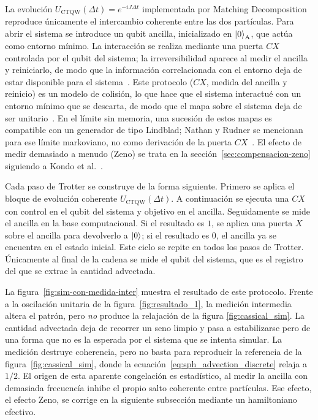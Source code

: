 La evolución $U_{\mathrm{CTQW}}(\Delta t)=e^{-iJ\Delta t}$ implementada por Matching Decomposition reproduce únicamente el intercambio coherente entre las dos partículas. Para abrir el sistema se introduce un qubit ancilla, inicializado en $\ket{0}_{\mathrm{A}}$, que actúa como entorno mínimo. La interacción se realiza mediante una puerta $CX$ controlada por el qubit del sistema; la irreversibilidad aparece al medir el ancilla y reiniciarlo, de modo que la información correlacionada con el entorno deja de estar disponible para el sistema~\cite{nielsen2010}. Este protocolo ($CX$, medida del ancilla y reinicio) es un modelo de colisión, lo que hace que el sistema interactué con un entorno mínimo que se descarta, de modo que el mapa sobre el sistema deja de ser unitario~\cite{Ciccarello_2022,nielsen2010}. En el límite sin memoria, una sucesión de estos mapas es compatible con un generador de tipo Lindblad; Nathan y Rudner se mencionan para ese límite markoviano, no como derivación de la puerta $CX$~\cite{Nathan2020UniversalLindblad}. El efecto de medir demasiado a menudo (Zeno) se trata en la sección~\ref{sec:compensacion-zeno} siguiendo a Kondo et al.~\cite{Kondo2016QZE}.

Cada paso de Trotter se construye de la forma siguiente. Primero se aplica el bloque de evolución coherente $U_{\mathrm{CTQW}}(\Delta t)$. A continuación se ejecuta una $CX$ con control en el qubit del sistema y objetivo en el ancilla. Seguidamente se mide el ancilla en la base computacional. Si el resultado es $1$, se aplica una puerta $X$ sobre el ancilla para devolverlo a $\ket{0}$; si el resultado es $0$, el ancilla ya se encuentra en el estado inicial. Este ciclo se repite en todos los pasos de Trotter. Únicamente al final de la cadena se mide el qubit del sistema, que es el registro del que se extrae la cantidad advectada.

La figura~\ref{fig:sim-con-medida-inter} muestra el resultado de este protocolo. Frente a la oscilación unitaria de la figura~\ref{fig:resultado_1}, la medición intermedia altera el patrón, pero \emph{no} produce la relajación de la figura \ref{fig:cassical_sim}. La cantidad advectada deja de recorrer un seno limpio y pasa a estabilizarse pero de una forma que no es la esperada por el sistema que se intenta simular. La medición destruye coherencia, pero no basta para reproducir la referencia de la figura~\ref{fig:cassical_sim}, donde la ecuación~\eqref{eq:sph_advection_discrete} relaja a $1/2$. El origen de esta aparente congelación es estadístico, al medir la ancilla con demasiada frecuencía inhibe el propio salto coherente entre partículas. Ese efecto, el efecto Zeno, se corrige en la siguiente subsección mediante un hamiltoniano efectivo.

